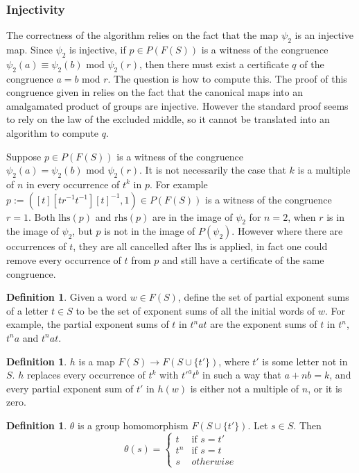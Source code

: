 \documentclass[11pt]{article} %
\theoremstyle{definition}
\theoremstyle{definition}
\theoremstyle{definition}
\theoremstyle{definition}
\theoremstyle{definition}
\newtheorem{defn}[theorem]{Definition}
\theoremstyle{definition}
\begin{document}
\subsubsection{Injectivity}\label{powproof}

The correctness of the algorithm relies on the fact that the map $\psi_2$ is an injective map.
Since $\psi_2$ is injective, if $p \in P(F(S))$ is a witness of the congruence
$\psi_2(a) \equiv \psi_2(b) \text{ mod } \psi_2(r)$, then there must exist a certificate
$q$ of the congruence $a = b \text{ mod }r$. The question is how to compute this. The proof
of this congruence given in \cite{PutmanOneRelator} relies on the fact that the canonical maps into an amalgamated product
of groups are injective. However the standard proof
seems to rely on the law of the excluded middle, so
it cannot be translated into an algorithm to compute $q$.

Suppose $p \in P(F(S))$ is a witness of the congruence
$\psi_2(a) = \psi_2(b) \text{ mod } \psi_2(r)$. It is not necessarily the case that $k$
is a multiple of $n$ in every occurrence of $t^k$ in $p$. For example
$p := ([t][tr^{-1}t^{-1}][t]^{-1}, 1) \in P(F(S))$ is a witness of the congruence
$r = 1$. Both $\text{lhs}(p)$ and $\text{rhs}(p)$ are in the image of
$\psi_2$ for $n = 2$, when $r$ is in the image of $\psi_2$,
but $p$ is not in the image of $P(\psi_2)$. However where there are
occurrences of $t$, they are all cancelled after $\text{lhs}$ is applied, in fact
one could remove every occurrence of $t$ from $p$ and still have a certificate of the same
congruence.

\begin{defn}
  Given a word $w \in F(S)$, define the set of partial exponent sums of a letter $t \in S$ to
  be the set of exponent sums of all the initial words of $w$. For example, the partial
  exponent sums of $t$ in $t^n a t$ are the exponent sums of $t$ in
  $t^n$, $t^na$ and $t^nat$.
\end{defn}

\begin{defn}
  $h$ is a map $F(S) \to F(S \cup \{t'\})$, where $t'$ is some letter not in $S$.
  $h$ replaces every occurrence of $t^k$ with $t'^at^b$ in such a way that $a + n b = k$,
  and every partial exponent sum of $t'$ in $h(w)$ is either not a multiple of $n$,
  or it is zero.
\end{defn}

\begin{defn}
  $\theta$ is a group homomorphism $F(S \cup \{t'\})$. Let $s \in S$. Then
  \begin{equation}
    \theta(s) = \begin{cases}
      t & \text{if } s = t' \\
      t^n & \text{if } s = t \\
      s & otherwise
    \end{cases}
  \end{equation}
\end{defn}
\end{document}
